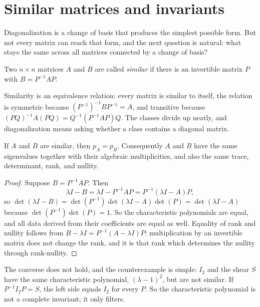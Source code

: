 \section{Similar matrices and invariants}

Diagonalization is a change of basis that produces the simplest possible form. But not every
matrix can reach that form, and the next question is natural: what stays the same across all
matrices connected by a change of basis?

\begin{definisi}
Two $n\times n$ matrices $A$ and $B$ are called \emph{similar} if there is an invertible matrix
$P$ with $B=P^{-1}AP$.
\end{definisi}


Similarity is an equivalence relation: every matrix is similar to itself, the relation is
symmetric because $(P^{-1})^{-1}BP^{-1}=A$, and transitive because
$(PQ)^{-1}A(PQ)=Q^{-1}(P^{-1}AP)Q$. The classes divide up neatly, and diagonalization means asking
whether a class contains a diagonal matrix.

\begin{proposisi}
If $A$ and $B$ are similar, then $p_{A}=p_{B}$. Consequently $A$ and $B$ have the same eigenvalues
together with their algebraic multiplicities, and also the same trace, determinant, rank, and
nullity.
\end{proposisi}

\begin{proof}
Suppose $B=P^{-1}AP$. Then
\[
  \lambda I-B=\lambda I-P^{-1}AP=P^{-1}(\lambda I-A)P,
\]
so
$\det(\lambda I-B)=\det(P^{-1})\det(\lambda I-A)\det(P)=\det(\lambda I-A)$ because
$\det(P^{-1})\det(P)=1$. So the characteristic polynomials are equal, and all data derived from
their coefficients are equal as well. Equality of rank and nullity follows from $B-\lambda I=
P^{-1}(A-\lambda I)P$: multiplication by an invertible matrix does not change the rank, and it is
that rank which determines the nullity through rank-nullity.
\end{proof}

The converse does not hold, and the counterexample is simple: $I_{2}$ and the shear $S$ have the
same characteristic polynomial, $(\lambda-1)^{2}$, but are not similar. If $P^{-1}I_{2}P=S$, the
left side equals $I_{2}$ for every $P$. So the characteristic polynomial is not a complete
invariant; it only filters.

